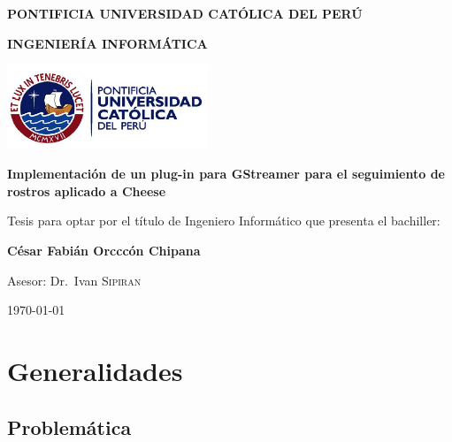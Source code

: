 \documentclass[a4paper,openright,12pt]{report}
\begin{document}
\begin{titlepage}
	\centering

	{\sffamily\large\bfseries PONTIFICIA UNIVERSIDAD CATÓLICA DEL PERÚ \par}
	\vspace{0.2cm}
	{\sffamily\large\bfseries INGENIERÍA INFORMÁTICA\par}
	\vfill

	\includegraphics[width=6cm]{../images/logo-pucp.png}\par\vspace{1cm}
	\vspace{1.5cm}

	{\sffamily\large\bfseries Implementación de un plug-in para GStreamer para
	el seguimiento de rostros aplicado a Cheese\par}
	\vspace{2cm}

	{\sffamily\small Tesis para optar por el título de Ingeniero Informático que
		presenta el bachiller: }

	{\sffamily\Large\bf	César Fabián Orcccón Chipana \par}
	{ \par}
	\vfill
	{\sffamily Asesor: Dr.~Ivan \textsc{Sipiran} \par}

	\vfill

	{\sffamily\large \today\par}
\end{titlepage}



\tableofcontents
\chapter{Generalidades}
\section{Problemática}
\end{document}
